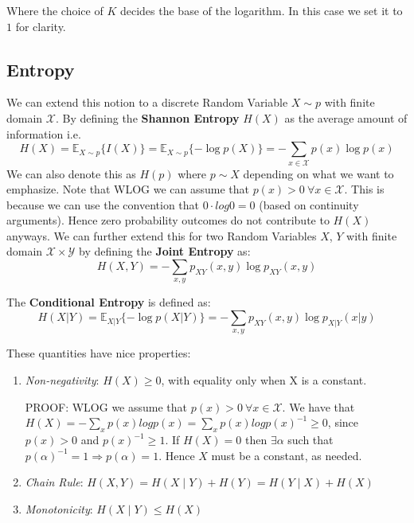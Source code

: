 \documentclass[]{article}
\theoremstyle{mattstyle}
\theoremstyle{definition}
\begin{document}
Where the choice of $K$ decides the base of the logarithm. In this case we set it to $1$ for clarity.

\subsection{Entropy}
We can extend this notion to a discrete Random Variable $X\sim p$ with finite domain $\mathcal{X}$. By defining the \textbf{Shannon Entropy} $H(X)$ as the average amount of information i.e. 
\begin{equation}
H(X) = \mathbb{E}_{X\sim p}\{I(X)\} = \mathbb{E}_{X\sim p}\{-\log p(X)\} = -\sum_{x\in\mathcal{X}}p(x)\log p(x)
\end{equation}
We can also denote this as $H(p)$ where $p \sim X$ depending on what we want to emphasize. Note that WLOG we can assume that \(p(x)>0 \ \forall x\in\mathcal{X}\). This is because we can use the convention that \(0\cdot log0 = 0\) (based on continuity arguments). Hence zero probability outcomes do not contribute to $H(X)$ anyways. We can further extend this for two Random Variables $X$, $Y$ with finite domain \(\mathcal{X}\times\mathcal{Y}\) by defining the \textbf{Joint Entropy} as:
\begin{equation}
H(X,Y) = -\sum_{x,y}p_{XY}(x,y)\log p_{XY}(x,y)
\end{equation}

The \textbf{Conditional Entropy} is defined as:
\begin{equation}
H(X|Y) = \mathbb{E}_{X|Y}\{-\log p(X|Y)\} = -\sum_{x,y}p_{XY}(x,y)\log p_{X|Y}(x|y)
\end{equation}

These quantities have nice properties:
\begin{enumerate}
	\item \emph{Non-negativity}: \(H(X)\ge0\), with equality only when X is a constant.
	
	PROOF: WLOG we assume that \(p(x)>0 \ \forall x\in\mathcal{X}\). We have that \(H(X) = -\sum_{x} p(x)logp(x) = \sum_{x} p(x)logp(x)^{-1}\ge0\), since \(p(x)>0\) and \(p(x)^{-1} \ge 1\). If \(H(X)=0\) then \(\exists \alpha\) such that \(p(\alpha)^{-1}=1 \Rightarrow p(\alpha)=1\). Hence \(X\) must be a constant, as needed.
	
	\item \emph{Chain Rule}: $H(X,Y) = H(X \mid Y) + H(Y) = H(Y \mid X) + H(X)$ 
	\item \emph{Monotonicity}: $H(X\mid Y) \le H(X)$ 
\end{enumerate}
\end{document}

